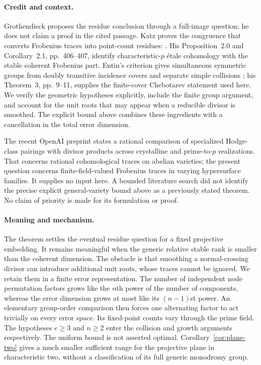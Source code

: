\documentclass[11pt]{article}
\theoremstyle{remark}\newtheorem{remark}[theorem]{Remark}
\begin{document}
\paragraph{Credit and context.}
Grothendieck proposes the residue conclusion through a full-image question; he does not claim a proof in the cited passage. Katz proves the congruence that converts Frobenius traces into point-count residues: \citet[Expos\'e~XXII, Theorem~3.1 and Corollary~3.2, pp.~410--411]{Katz}. His Proposition~2.0 and Corollary~2.1, pp.~406--407, identify characteristic-$p$ \'etale cohomology with the stable coherent Frobenius part. Entin's criterion gives simultaneous symmetric groups from doubly transitive incidence covers and separate simple collisions \citep[Proposition~3.1 and proof, arXiv version~3, pp.~7--8]{Entin}; his Theorem~3, pp.~9--11, supplies the finite-cover Chebotarev statement used here. We verify the geometric hypotheses explicitly, include the finite group argument, and account for the unit roots that may appear when a reducible divisor is smoothed. The explicit bound above combines these ingredients with a cancellation in the total error dimension.

The recent OpenAI preprint \citep[Theorem~1.1 and Introduction, pp.~1--3]{OpenAI} states a rational comparison of specialized Hodge-class pairings with divisor products across crystalline and prime-to-$p$ realizations. That concerns rational cohomological traces on abelian varieties; the present question concerns finite-field-valued Frobenius traces in varying hypersurface families. It supplies no input here. A bounded literature search did not identify the precise explicit general-variety bound above as a previously stated theorem. No claim of priority is made for its formulation or proof.

\paragraph{Meaning and mechanism.}
The theorem settles the eventual residue question for a fixed projective embedding. It remains meaningful when the generic relative stable rank is smaller than the coherent dimension. The obstacle is that smoothing a normal-crossing divisor can introduce additional unit roots, whose traces cannot be ignored. We retain them in a finite error representation. The number of independent node permutation factors grows like the $n$th power of the number of components, whereas the error dimension grows at most like its $(n-1)$st power. An elementary group-order comparison then forces one alternating factor to act trivially on every error space. Its fixed-point counts vary through the prime field. The hypotheses $e\ge3$ and $n\ge2$ enter the collision and growth arguments respectively. The uniform bound is not asserted optimal. Corollary~\ref{cor:plane-two} gives a much smaller sufficient range for the projective plane in characteristic two, without a classification of its full generic monodromy group.
\end{document}
